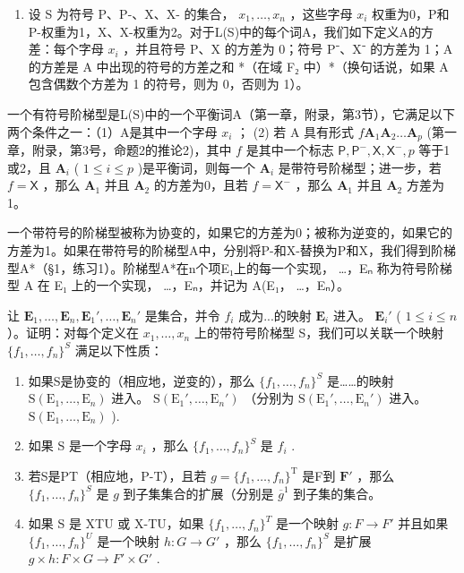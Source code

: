 \exercisegroup

\begin{enumerate}
\def\labelenumi{\arabic{enumi}.}
\tightlist
\item
  设 S 为符号 P、P-、X、X- 的集合， \(x_1, \ldots, x_n\) ，这些字母 \(x_i\) 权重为0，P和P-权重为1，X、X-权重为2。对于L(S)中的每个词A，我们如下定义A的方差：每个字母 \(x_i\) ，并且符号 P、X 的方差为 0；符号 P⁻、X⁻ 的方差为 1；A 的方差是 A 中出现的符号的方差之和 *（在域 F₂ 中）*（换句话说，如果 A 包含偶数个方差为 1 的符号，则为 0，否则为 1）。
\end{enumerate}

一个有符号阶梯型是L(S)中的一个平衡词A（第一章，附录，第3节），它满足以下两个条件之一：（1）A是其中一个字母 \(x_i\) ； (2) 若 A 具有形式 \(f\mathbf{A}_1\mathbf{A}_2 \ldots \mathbf{A}_p\) (第一章，附录，第3号，命题2的推论2)，其中 \(f\) 是其中一个标志 \(\mathsf{P}, \mathsf{P}^{-}, \mathsf{X}, \mathsf{X}^{-}, p\) 等于1或2，且 \(\mathbf{A}_i\) ( \(1 \leqslant i \leqslant p\) )是平衡词，则每一个 \(\mathbf{A}_i\) 是带符号阶梯型；进一步，若 \(f = \mathsf{X}\) ，那么 \(\mathbf{A}_1\) 并且 \(\mathbf{A}_2\) 的方差为0，且若 \(f = \mathsf{X}^{-}\) ，那么 \(\mathbf{A}_1\) 并且 \(\mathbf{A}_2\) 方差为1。

一个带符号的阶梯型被称为协变的，如果它的方差为0；被称为逆变的，如果它的方差为1。如果在带符号的阶梯型A中，分别将P-和X-替换为P和X，我们得到阶梯型A*（§1，练习1）。阶梯型A*在n个项E₁上的每一个实现， \ldots，Eₙ 称为符号阶梯型 A 在 E₁ 上的一个实现， \ldots，Eₙ，并记为 A(E₁， \ldots，Eₙ）。

让 \(\mathbf{E}_1, \ldots, \mathbf{E}_n, \mathbf{E}_1', \ldots, \mathbf{E}_n'\) 是集合，并令 \(f_i\) 成为...的映射 \(\mathbf{E}_i\) 进入。 \(\mathbf{E}_i'\) ( \(1 \leqslant i \leqslant n\) ）。证明：对每个定义在 \(x_1, \ldots, x_n\) 上的带符号阶梯型 S，我们可以关联一个映射 \(\{f_1, \ldots, f_n\}^{S}\) 满足以下性质：

\begin{enumerate}
\def\labelenumi{(\roman{enumi})}
\item
  如果S是协变的（相应地，逆变的），那么 \(\{f_1, \ldots, f_n\}^{S}\) 是……的映射 \(\mathrm{S}(\mathrm{E}_1, \ldots, \mathrm{E}_n)\) 进入。 \(\mathrm{S}(\mathrm{E}_1', \ldots, \mathrm{E}_n')\) （分别为 \(\mathrm{S}(\mathrm{E}_1', \ldots, \mathrm{E}_n')\) 进入。 \(\mathrm{S}(\mathrm{E}_1, \ldots, \mathrm{E}_n)\) ).
\item
  如果 S 是一个字母 \(x_{i}\) ，那么 \(\{f_1, \ldots, f_n\}^{S}\) 是 \(f_{i}\) .
\item
  若S是PT（相应地，P-T），且若 \(g = \{f_1, \ldots, f_n\}^{\mathrm{T}}\) 是F到 \(\mathbf{F}'\) ，那么 \(\{f_1, \ldots, f_n\}^{S}\) 是 \(g\) 到子集集合的扩展（分别是 \(\overline{g}^1\) 到子集的集合。
\item
  如果 S 是 XTU 或 X-TU，如果 \(\{f_{1},\ldots,f_{n}\}^{T}\) 是一个映射 \(g:F\to F'\) 并且如果 \(\{f_{1},\ldots,f_{n}\}^{U}\) 是一个映射 \(h:G\to G'\) ，那么 \(\{f_{1},\ldots,f_{n}\}^{S}\) 是扩展 \(g\times h:F\times G\to F'\times G'\) .
\end{enumerate}

